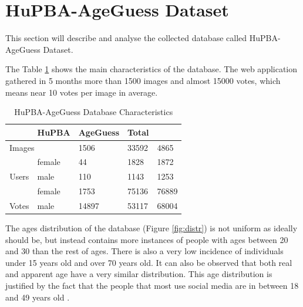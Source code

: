 \section{HuPBA-AgeGuess Dataset}

This section will describe and analyse the collected database called HuPBA-AgeGuess Dataset.  

The Table \ref{tab:charact} shows the main characteristics of the database. The web application gathered in 5 months more than 1500 images and almost 15000 votes, which means near 10 votes per image in average.  

\begin{table}[h]
	\centering
	\begin{tabular}{|c|l|l|l|l|}
		\rowcolor[HTML]{EFEFEF} 
		\hline
		\multicolumn{2}{|l|}{\cellcolor[HTML]{EFEFEF}\textbf{Features}} & HuPBA & AgeGuess & Total \\ \hline
		\multicolumn{2}{|l|}{Images}                                    & 1506  & 33592 & 4865\\ \hline
		& female                & 44  & 1828 & 1872  \\ \cline{2-3} 
		\multirow{-2}{*}{Users}                 & male                  & 110 & 1143 & 1253 \\ \hline
		& female                & 1753  & 75136 & 76889\\ \cline{2-3} 
		\multirow{-2}{*}{Votes}                 & male                  & 14897 & 53117 & 68004\\ \hline
	\end{tabular}
	\caption{HuPBA-AgeGuess Database Characteristics}
	\label{tab:charact}
\end{table}
	
The ages distribution of the database (Figure \ref{fig:distr}) is not uniform as ideally should be, but instead contains more instances of people with ages between 20 and 30 than the rest of ages. There is also a very low incidence of individuals under 15 years old and over 70 years old. It can also be observed that both real and apparent age have a very similar distribution. This age distribution is justified by the fact that the people that most use social media are in between 18 and 49 years old \cite{brenner201372}.


